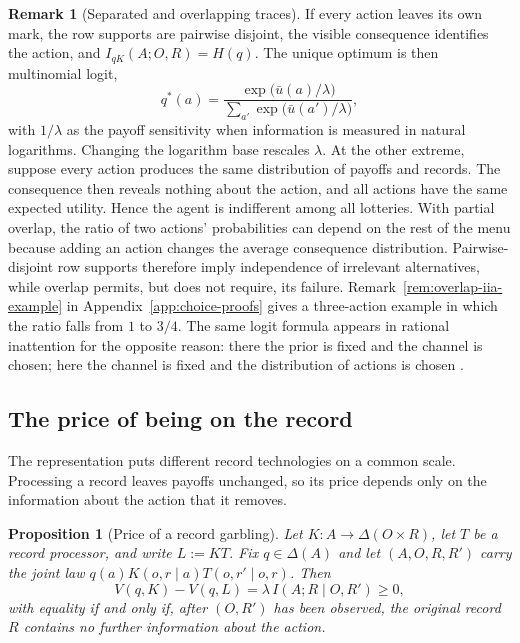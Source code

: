 \documentclass[11pt,a4paper]{article}
\newtheorem{proposition}[theorem]{Proposition}
\theoremstyle{definition}
\newtheorem{remark}[theorem]{Remark}
\newcommand{\D}{\Delta}
\newcommand{\I}{I}
\newcommand{\Sh}{H}
\newcommand{\1}{\mathbf 1}
\begin{document}
\begin{remark}[Separated and overlapping traces]\label{rem:logit}
If every action leaves its own mark, the row supports are pairwise disjoint, the visible consequence identifies
the action, and $\I_{qK}(A;O,R)=\Sh(q)$.  The unique optimum is then multinomial logit,
\[
 q^*(a)
 =\frac{\exp\bigl(\bar u(a)/\lambda\bigr)}
 {\sum_{a'}\exp\bigl(\bar u(a')/\lambda\bigr)},
\]
with $1/\lambda$ as the payoff sensitivity when information is measured in natural logarithms.  Changing the
logarithm base rescales $\lambda$.  At the other extreme, suppose every action produces the same distribution of payoffs and records. The consequence then reveals nothing about the action, and all actions have the same expected utility. Hence the agent is indifferent among all lotteries.  With partial overlap, the ratio
of two actions' probabilities can depend on the rest of the menu because adding an action changes the average
consequence distribution.  Pairwise-disjoint row supports therefore imply independence of irrelevant
alternatives, while overlap permits, but does not require, its failure.  Remark~\ref{rem:overlap-iia-example} in
Appendix~\ref{app:choice-proofs} gives a three-action example in which the ratio falls from $1$ to $3/4$.
The same logit formula appears in rational inattention for the opposite reason: there the prior is fixed and the
channel is chosen; here the channel is fixed and the distribution of actions is chosen
\cite{MatejkaMcKay2015}.
\end{remark}

\subsection{The price of being on the record}\label{sec:record-price}

The representation puts different record technologies on a common scale.  Processing a record leaves payoffs
unchanged, so its price depends only on the information about the action that it removes.

\begin{proposition}[Price of a record garbling]\label{prop:garbling-price}
Let $K:A\to\D(O\times R)$, let $T$ be a record processor, and write
$L:=KT$.  Fix $q\in\D(A)$ and let $(A,O,R,R')$ carry the joint law $q(a)K(o,r\mid a)T(o,r'\mid o,r)$.  Then
\[
 V(q,K)-V(q,L)=\lambda\,\I\!\left(A;R\mid O,R'\right)\ge0,
\]
with equality if and only if, after $(O,R')$ has been observed, the original record $R$ contains no further
information about the action.
\end{proposition}
\end{document}
